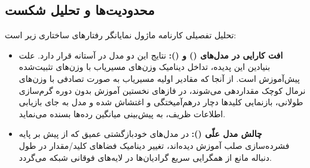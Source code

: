 \subsection{محدودیت‌ها و تحلیل شکست}
تحلیل تفصیلی کارنامه ماژول نمایانگر رفتارهای ساختاری زیر است:
\begin{itemize}
    \item \textbf{افت کارایی در مدل‌های  () و  ():} نتایج این دو مدل در آستانه  قرار دارد. علت بنیادین این پدیده، تداخل دینامیک وزن‌های مسیریاب با وزن‌های تثبیت‌شده پیش‌آموزش است. از آنجا که مقادیر اولیه مسیریاب به صورت تصادفی با وزن‌های نرمال کوچک مقداردهی می‌شوند، در فازهای نخستین آموزش بدون دوره گرم‌سازی طولانی، بازنمایی کلیدها دچار درهم‌آمیختگی و اغتشاش شده و مدل به جای بازیابی اطلاعات ظریف، به پیش‌بینی میانگین رده‌ها بسنده می‌نماید.
    \item \textbf{چالش مدل علّی  ():} در مدل‌های خودبازگشتی عمیق که از پیش بر پایه فشرده‌سازی صلب  آموزش دیده‌اند، تغییر دینامیک فضاهای کلید/مقدار در طول دنباله مانع از همگرایی سریع گرادیان‌ها در لایه‌های فوقانی شبکه می‌گردد.
\end{itemize}
